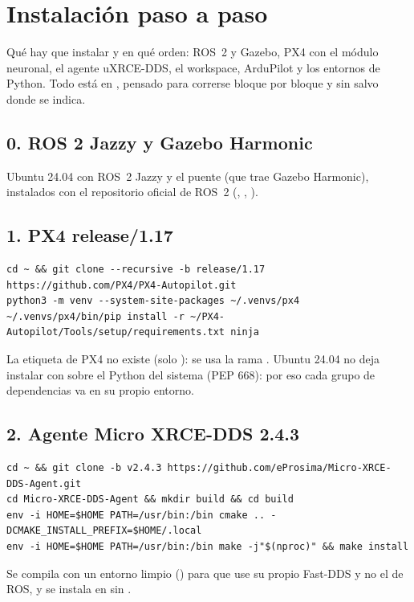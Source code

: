 \chapter{Instalación paso a paso}
\label{cap:instalacion}

\begin{enpocas}
Qué hay que instalar y en qué orden: ROS~2 y Gazebo, PX4 con el módulo neuronal, el agente uXRCE-DDS,
el workspace, ArduPilot y los entornos de Python. Todo está en ,
pensado para correrse bloque por bloque y sin  salvo donde se indica.
\end{enpocas}

\section{0. ROS 2 Jazzy y Gazebo Harmonic}

Ubuntu 24.04 con ROS~2 Jazzy y el puente  (que trae Gazebo Harmonic), instalados
con el repositorio oficial de ROS~2 (, ,
).

\section{1. PX4 release/1.17}

\begin{lstlisting}[style=bash]
cd ~ && git clone --recursive -b release/1.17 https://github.com/PX4/PX4-Autopilot.git
python3 -m venv --system-site-packages ~/.venvs/px4
~/.venvs/px4/bin/pip install -r ~/PX4-Autopilot/Tools/setup/requirements.txt ninja
\end{lstlisting}

\begin{aviso}
La etiqueta  de PX4 no existe (solo ): se usa la rama .
Ubuntu 24.04 no deja instalar con  sobre el Python del sistema (PEP 668): por eso
cada grupo de dependencias va en su propio entorno.
\end{aviso}

\section{2. Agente Micro XRCE-DDS 2.4.3}

\begin{lstlisting}[style=bash]
cd ~ && git clone -b v2.4.3 https://github.com/eProsima/Micro-XRCE-DDS-Agent.git
cd Micro-XRCE-DDS-Agent && mkdir build && cd build
env -i HOME=$HOME PATH=/usr/bin:/bin cmake .. -DCMAKE_INSTALL_PREFIX=$HOME/.local
env -i HOME=$HOME PATH=/usr/bin:/bin make -j"$(nproc)" && make install
\end{lstlisting}
Se compila con un entorno limpio () para que use su propio Fast-DDS y no el de ROS, y se
instala en  sin .

